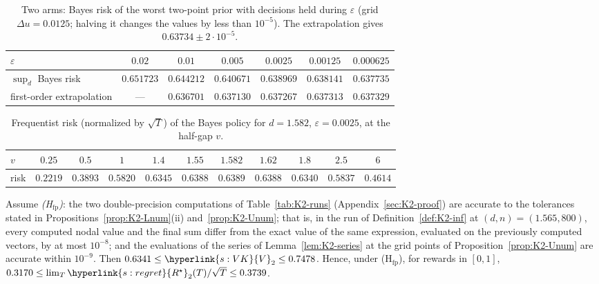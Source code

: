 \documentclass[11pt]{article}
\DeclareRobustCommand{\sy}[2]{{\hyperlink{#1}{#2}}}
\newcommand{\1}{\mathbf{1}}
\newcommand{\Rs}{\sy{s:regret}{R^\star}}
\newcommand{\VK}{\sy{s:VK}{V}}
\begin{document}
\begin{table}[h]\centering\small
\begin{tabular}{lcccccc}
\hline
$\varepsilon$ & $0.02$ & $0.01$ & $0.005$ & $0.0025$ & $0.00125$ & $0.000625$\\ \hline
$\sup_d$ Bayes risk & $0.651723$ & $0.644212$ & $0.640671$ & $0.638969$ & $0.638141$ & $0.637735$\\
first-order extrapolation & --- & $0.636701$ & $0.637130$ & $0.637267$ & $0.637313$ & $0.637329$\\
\hline
\end{tabular}
\caption{Two arms: Bayes risk of the worst two-point prior with decisions held during $\varepsilon$ (grid $\Delta u=0.0125$; halving it changes the values by less than $10^{-5}$).
The extrapolation gives $0.63734\pm2\cdot10^{-5}$.}\label{tab:eps}
\end{table}

\begin{table}[h]\centering\small
\begin{tabular}{lcccccccccc}
\hline
$v$ & $0.25$ & $0.5$ & $1$ & $1.4$ & $1.55$ & $\mathbf{1.582}$ & $1.62$ & $1.8$ & $2.5$ & $6$\\ \hline
risk & $0.2219$ & $0.3893$ & $0.5820$ & $0.6345$ & $0.6388$ & $\mathbf{0.6389}$ & $0.6388$ & $0.6340$ & $0.5837$ & $0.4614$\\
\hline
\end{tabular}
\caption{Frequentist risk (normalized by $\sqrt T$) of the Bayes policy for $d=1.582$, $\varepsilon=0.0025$, at the half-gap $v$.}\label{tab:saddle}
\end{table}

\begin{proposition}\label{prop:K2}
Assume \emph{(H$_{\mathrm{fp}}$)}: the two double-precision computations of Table~\ref{tab:K2-runs} (Appendix~\ref{sec:K2-proof}) are accurate to the tolerances
stated in Propositions~\ref{prop:K2-Lnum}(ii) and~\ref{prop:K2-Unum}; that is, in the run of Definition~\ref{def:K2-inf} at $(d,n)=(1.565,800)$, every computed nodal
value and the final sum differ from the exact value of the same expression, evaluated on the previously computed vectors, by at most $10^{-8}$; and the
evaluations of the series of Lemma~\ref{lem:K2-series} at the grid points of Proposition~\ref{prop:K2-Unum} are accurate within $10^{-9}$. Then
$0.6341\le\VK_2\le0.7478$. Hence, under (H$_{\mathrm{fp}}$), for rewards in $[0,1]$, $0.3170\le\lim_T\Rs_2(T)/\sqrt T\le0.3739$.
\end{proposition}
\end{document}
